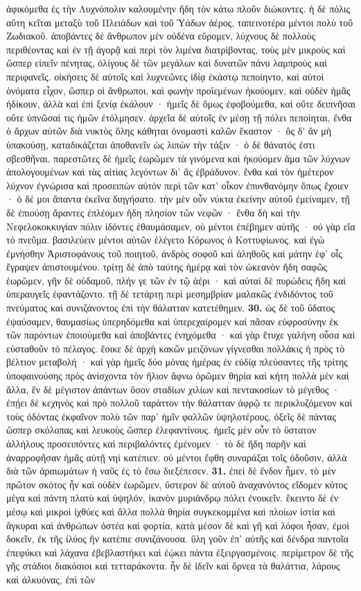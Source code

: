 \documentclass[a4paper, 11pt, oneside, polutonikogreek, german]{article}
\begin{document}
ἀφικόμεθα ἐς τὴν Λυχνόπολιν καλουμένην ἤδη τὸν κάτω πλοῦν διώκοντες. ἡ δὲ πόλις αὕτη κεῖται μεταξὺ τοῦ Πλειάδων καὶ τοῦ Ὑάδων ἀέρος, ταπεινοτέρα μέντοι πολὺ τοῦ Ζωδιακοῦ. ἀποβάντες δὲ ἄνθρωπον μὲν οὐδένα εὕρομεν, λύχνους δὲ πολλοὺς περιθέοντας καὶ ἐν τῇ ἀγορᾷ καὶ περὶ τὸν λιμένα διατρίβοντας, τοὺς μὲν μικροὺς καὶ ὥσπερ εἰπεῖν πένητας, ὀλίγους δὲ τῶν μεγάλων καὶ δυνατῶν πάνυ λαμπροὺς καὶ περιφανεῖς. οἰκήσεις δὲ αὐτοῖς καὶ λυχνεῶνες ἰδίᾳ ἑκάστῳ πεποίηντο, καὶ αὐτοὶ ὀνόματα εἶχον, ὥσπερ οἱ ἄνθρωποι, καὶ φωνὴν προϊεμένων ἠκούομεν, καὶ οὐδὲν ἡμᾶς ἠδίκουν, ἀλλὰ καὶ ἐπὶ ξενίᾳ ἐκάλουν · ἡμεῖς δὲ ὅμως ἐφοβούμεθα, καὶ οὔτε δειπνῆσαι οὔτε ὑπνῶσαί τις ἡμῶν ἐτόλμησεν. ἀρχεῖα δὲ αὐτοῖς ἐν μέσῃ τῇ πόλει πεποίηται, ἔνθα ὁ ἄρχων αὐτῶν διὰ νυκτὸς ὅλης κάθηται ὀνομαστὶ καλῶν ἕκαστον · ὃς δ' ἂν μὴ ὑπακούσῃ, καταδικάζεται ἀποθανεῖν ὡς λιπὼν τὴν τάξιν · ὁ δὲ θάνατός ἐστι σβεσθῆναι. παρεστῶτες δὲ ἡμεῖς ἑωρῶμεν τὰ γινόμενα καὶ ἠκούομεν ἅμα τῶν λύχνων ἀπολογουμένων καὶ τὰς αἰτίας λεγόντων δι' ἃς ἐβράδυνον. ἔνθα καὶ τὸν ἡμέτερον λύχνον ἐγνώρισα καὶ προσειπὼν αὐτὸν περὶ τῶν κατ' οἶκον ἐπυνθανόμην ὅπως ἔχοιεν · ὁ δέ μοι ἅπαντα ἐκεῖνα διηγήσατο. τὴν μὲν οὖν νύκτα ἐκείνην αὐτοῦ ἐμείναμεν, τῇ δὲ ἐπιούσῃ ἄραντες ἐπλέομεν ἤδη πλησίον τῶν νεφῶν · ἔνθα δὴ καὶ τὴν Νεφελοκοκκυγίαν πόλιν ἰδόντες ἐθαυμάσαμεν, οὐ μέντοι ἐπέβημεν αὐτῆς · οὐ γὰρ εἴα τὸ πνεῦμα. βασιλεύειν μέντοι αὐτῶν ἐλέγετο Κόρωνος ὁ Κοττυφίωνος. καὶ ἐγὼ ἐμνήσθην Ἀριστοφάνους τοῦ ποιητοῦ, ἀνδρὸς σοφοῦ καὶ ἀληθοῦς καὶ μάτην ἐφ' οἷς ἔγραψεν ἀπιστουμένου. τρίτῃ δὲ ἀπὸ ταύτης ἡμέρᾳ καὶ τὸν ὠκεανὸν ἤδη σαφῶς ἑωρῶμεν, γῆν δὲ οὐδαμοῦ, πλήν γε τῶν ἐν τῷ ἀέρι · καὶ αὐταὶ δὲ πυρώδεις ἤδη καὶ ὑπεραυγεῖς ἐφαντάζοντο. τῇ δὲ τετάρτῃ περὶ μεσημβρίαν μαλακῶς ἐνδιδόντος τοῦ πνεύματος καὶ συνιζάνοντος ἐπὶ τὴν θάλατταν κατετέθημεν. \textbf{30.} ὡς δὲ τοῦ ὕδατος ἐψαύσαμεν, θαυμασίως ὑπερηδόμεθα καὶ ὑπερεχαίρομεν καὶ πᾶσαν εὐφροσύνην ἐκ τῶν παρόντων ἐποιούμεθα καὶ ἀποβάντες ἐνηχόμεθα · καὶ γὰρ ἔτυχε γαλήνη οὖσα καὶ εὐσταθοῦν τὸ πέλαγος. ἔοικε δὲ ἀρχὴ κακῶν μειζόνων γίγνεσθαι πολλάκις ἡ πρὸς τὸ βέλτιον μεταβολή · καὶ γὰρ ἡμεῖς δύο μόνας ἡμέρας ἐν εὐδίᾳ πλεύσαντες τῆς τρίτης ὑποφαινούσης πρὸς ἀνίσχοντα τὸν ἥλιον ἄφνω ὁρῶμεν θηρία καὶ κήτη πολλὰ μὲν καὶ ἄλλα, ἓν δὲ μέγιστον ἁπάντων ὅσον σταδίων χιλίων καὶ πεντακοσίων τὸ μέγεθος · ἐπῄει δὲ κεχηνὸς καὶ πρὸ πολλοῦ ταράττον τὴν θάλατταν ἀφρῷ τε περικλυζόμενον καὶ τοὺς ὀδόντας ἐκφαῖνον πολὺ τῶν παρ' ἡμῖν φαλλῶν ὑψηλοτέρους, ὀξεῖς δὲ πάντας ὥσπερ σκόλοπας καὶ λευκοὺς ὥσπερ ἐλεφαντίνους. ἡμεῖς μὲν οὖν τὸ ὕστατον ἀλλήλους προσειπόντες καὶ περιβαλόντες ἐμένομεν · τὸ δὲ ἤδη παρῆν καὶ ἀναρροφῆσαν ἡμᾶς αὐτῇ νηὶ κατέπιεν. οὐ μέντοι ἔφθη συναράξαι τοῖς ὀδοῦσιν, ἀλλὰ διὰ τῶν ἀραιωμάτων ἡ ναῦς ἐς τὸ ἔσω διεξέπεσεν. \textbf{31.} ἐπεὶ δὲ ἔνδον ἦμεν, τὸ μὲν πρῶτον σκότος ἦν καὶ οὐδὲν ἑωρῶμεν, ὕστερον δὲ αὐτοῦ ἀναχανόντος εἴδομεν κύτος μέγα καὶ πάντη πλατὺ καὶ ὑψηλόν, ἱκανὸν μυριάνδρῳ πόλει ἐνοικεῖν. ἔκειντο δὲ ἐν μέσῳ καὶ μικροὶ ἰχθύες καὶ ἄλλα πολλὰ θηρία συγκεκομμένα καὶ πλοίων ἱστία καὶ ἄγκυραι καὶ ἀνθρώπων ὀστέα καὶ φορτία, κατὰ μέσον δὲ καὶ γῆ καὶ λόφοι ἦσαν, ἐμοὶ δοκεῖν, ἐκ τῆς ἰλύος ἣν κατέπιε συνιζάνουσα. ὕλη γοῦν ἐπ' αὐτῆς καὶ δένδρα παντοῖα ἐπεφύκει καὶ λάχανα ἐβεβλαστήκει καὶ ἐῴκει πάντα ἐξειργασμένοις. περίμετρον δὲ τῆς γῆς στάδιοι διακόσιοι καὶ τετταράκοντα. ἦν δὲ ἰδεῖν καὶ ὄρνεα τὰ θαλάττια, λάρους καὶ ἀλκυόνας, ἐπὶ τῶν 
\end{document}
